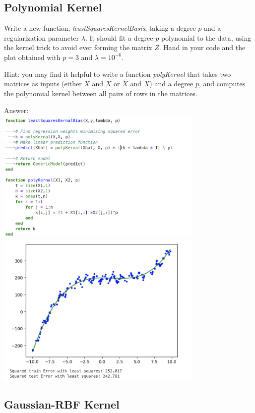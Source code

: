 \documentclass{article}
\def\ans#1{\par\gre{Answer: #1}}
\def\blu#1{{\color{blu}#1}}
\def\gre#1{{\color{gre}#1}}
\begin{document}
\subsection{Polynomial Kernel}

Write a new function, \emph{leastSquaresKernelBasis}, taking a degree $p$ and a regularization parameter $\lambda$. It should fit a degree-$p$ polynomial to the data, using the kernel trick to avoid ever forming the matrix $Z$. \blu{Hand in your code and the plot obtained with $p=3$ and $\lambda =10^{-6}$.}

Hint: you may find it helpful to write a function \emph{polyKernel} that takes two matrices as inputs (either $X$ and $X$ or $\tilde{X}$ and $X$) and a degree $p$, and computes the polynomial kernel between all pairs of rows in the matrices.
\ans{\\
    \includegraphics[width=10cm]{Q12.png}\\
    \includegraphics[width=10cm]{Q13.png}
}

\subsection{Gaussian-RBF Kernel}
\end{document}
